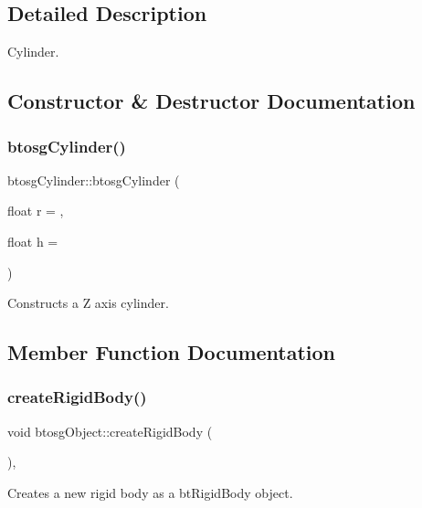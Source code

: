 \subsection{Detailed Description}
Cylinder. 

\subsection{Constructor \& Destructor Documentation}
\mbox{\label{classbtosgCylinder_a85e2517d8fd8a16ad7514f2f70cc1086}} 
\subsubsection{\texorpdfstring{btosg\+Cylinder()}{btosgCylinder()}}
{\footnotesize\ttfamily btosg\+Cylinder\+::btosg\+Cylinder (\begin{DoxyParamCaption}\item[{float}]{r = {},  }\item[{float}]{h = {} }\end{DoxyParamCaption})\hspace{0.3cm}{\ttfamily [inline]}}

Constructs a Z axis cylinder. 

\subsection{Member Function Documentation}
\mbox{\label{classbtosgObject_a029dbe9134fa94e7355799f67fb2cd6d}} 
\subsubsection{\texorpdfstring{create\+Rigid\+Body()}{createRigidBody()}}
{\footnotesize\ttfamily void btosg\+Object\+::create\+Rigid\+Body (\begin{DoxyParamCaption}{ }\end{DoxyParamCaption})\hspace{0.3cm}{\ttfamily [inline]}, {\ttfamily [inherited]}}

Creates a new rigid body as a bt\+Rigid\+Body object. \mbox{\label{classbtosgObject_a2019ec63bde02b72600450c7c985e77a}} 
